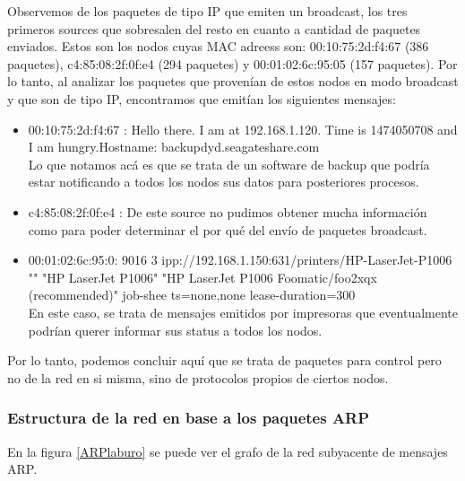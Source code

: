 Observemos de los paquetes de tipo IP que emiten un broadcast, los tres primeros sources que sobresalen del resto en cuanto a cantidad de paquetes enviados. Estos son los nodos cuyas MAC adreess son: 00:10:75:2d:f4:67 (386 paquetes), c4:85:08:2f:0f:e4 (294 paquetes) y 00:01:02:6c:95:05 (157 paquetes).
Por lo tanto, al analizar los paquetes que provenían de estos nodos en modo broadcast y que son de tipo IP, encontramos que emitían los siguientes mensajes:

\begin{itemize}
	\item 00:10:75:2d:f4:67	: Hello there. I am at 192.168.1.120. Time is 1474050708 and I am hungry.Hostname: backupdyd.seagateshare.com \\
		Lo que notamos ac\'a es que se trata de un software de backup que podr\'ia estar notificando a todos los nodos sus datos para posteriores procesos.
	\item c4:85:08:2f:0f:e4	: De este source no pudimos obtener mucha informaci\'on como para poder determinar el por qu\'e del env\'io de paquetes broadcast.
	\item 00:01:02:6c:95:0: 9016 3 ipp://192.168.1.150:631/printers/HP-LaserJet-P1006 "" "HP LaserJet P1006" "HP LaserJet P1006 Foomatic/foo2xqx (recommended)" job-shee    ts=none,none lease-duration=300 \\
		En este caso, se trata de mensajes emitidos por impresoras que eventualmente podr\'ian querer informar sus status a todos los nodos.
\end{itemize}

Por lo tanto, podemos concluir aqu\'i que se trata de paquetes para control pero no de la red en si misma, sino de protocolos propios de ciertos nodos.

\subsubsection{Estructura de la red en base a los paquetes ARP}

\par En la figura \ref{ARPlaburo} se puede ver el grafo de la red subyacente de mensajes ARP.

